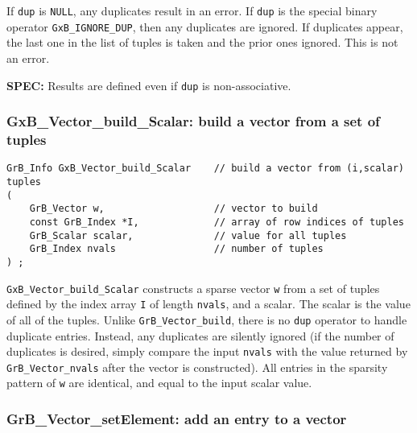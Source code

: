 \documentclass[12pt]{article}
\begin{document}
{If \verb'dup' is \verb'NULL', any duplicates result in an error.
If \verb'dup' is the special binary operator \verb'GxB_IGNORE_DUP', then
any duplicates are ignored.  If duplicates appear, the last one in the
list of tuples is taken and the prior ones ignored.  This is not an error.

\begin{alert}
{\bf SPEC:} Results are defined even if \verb'dup' is non-associative.
\end{alert}

\subsubsection{{\sf GxB\_Vector\_build\_Scalar:} build a vector from a set of tuples}
\label{vector_build_Scalar}

\begin{mdframed}[userdefinedwidth=6in]
{\footnotesize
\begin{verbatim}
GrB_Info GxB_Vector_build_Scalar    // build a vector from (i,scalar) tuples
(
    GrB_Vector w,                   // vector to build
    const GrB_Index *I,             // array of row indices of tuples
    GrB_Scalar scalar,              // value for all tuples
    GrB_Index nvals                 // number of tuples
) ;
\end{verbatim} } \end{mdframed}

\verb'GxB_Vector_build_Scalar' constructs a sparse vector \verb'w' from a set
of tuples defined by the index array \verb'I' of length \verb'nvals', and a
scalar.  The scalar is the value of all of the tuples.  Unlike
\verb'GrB_Vector_build', there is no \verb'dup' operator to handle duplicate
entries.  Instead, any duplicates are silently ignored (if the number of
duplicates is desired, simply compare the input \verb'nvals' with the value
returned by \verb'GrB_Vector_nvals' after the vector is constructed).  All
entries in the sparsity pattern of \verb'w' are identical, and equal to the
input scalar value.

\newpage
\subsubsection{{\sf GrB\_Vector\_setElement:}    add an entry to a vector}
\label{vector_setElement}

}
\end{document}
